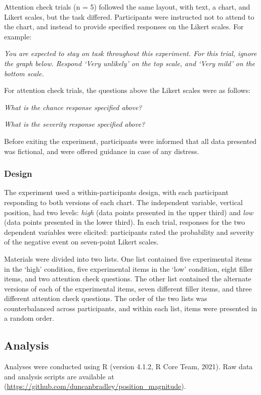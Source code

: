 \documentclass[journal]{vgtc}                %
\begin{document}
Attention check trials (n = 5) followed the same layout, with text, a chart, and Likert scales, but the task differed. Participants were instructed not to attend to the chart, and instead to provide specified responses on the Likert scales. For example:

\emph{You are expected to stay on task throughout this experiment. For this trial, ignore the graph below. Respond `Very unlikely' on the top scale, and `Very mild' on the bottom scale.}

For attention check trials, the questions above the Likert scales were as follows:

\emph{What is the chance response specified above?}

\emph{What is the severity response specified above?}

Before exiting the experiment, participants were informed that all data presented was fictional, and were offered guidance in case of any distress.

\hypertarget{design}{%
\subsubsection{Design}\label{design}}

The experiment used a within-participants design, with each participant responding to both versions of each chart. The independent variable, vertical position, had two levels: \emph{high} (data points presented in the upper third) and \emph{low} (data points presented in the lower third). In each trial, responses for the two dependent variables were elicited: participants rated the probability and severity of the negative event on seven-point Likert scales.

Materials were divided into two lists. One list contained five experimental items in the `high' condition, five experimental items in the `low' condition, eight filler items, and two attention check questions. The other list contained the alternate versions of each of the experimental items, seven different filler items, and three different attention check questions. The order of the two lists was counterbalanced across participants, and within each list, items were presented in a random order.

\hypertarget{analysis}{%
\subsection{Analysis}\label{analysis}}

Analyses were conducted using R (version 4.1.2, R Core Team, 2021). Raw data and analysis scripts are available at (\url{https://github.com/duncanbradley/position_magnitude}).
\end{document}
